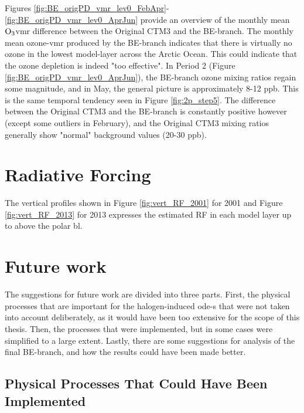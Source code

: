 Figures \ref{fig:BE_origPD_vmr_lev0_FebApr}-\ref{fig:BE_origPD_vmr_lev0_AprJun} provide an overview of the monthly mean $\mathrm{O_3}$\acrshort{vmr} difference between the Original CTM3 and the BE-branch. The monthly mean ozone-\acrshort{vmr} produced by the BE-branch indicates that there is virtually no ozone in the lowest model-layer across the Arctic Ocean. This could indicate that the ozone depletion is indeed "too effective". In Period 2 (Figure \ref{fig:BE_origPD_vmr_lev0_AprJun}), the BE-branch ozone mixing ratios regain some magnitude, and in May, the general picture is approximately 8-12 ppb. This is the same temporal tendency seen in Figure \ref{fig:2p_step5}. The difference between the Original CTM3 and the BE-branch is constantly positive however (except some outliers in February), and the Original CTM3 mixing ratios generally show "normal" background values (20-30 ppb). 

\section{Radiative Forcing}\label{sec:disc_RF}

The vertical profiles shown in Figure \ref{fig:vert_RF_2001} for 2001 and Figure \ref{fig:vert_RF_2013} for 2013 expresses the estimated RF in each model layer up to above the polar \acrlong{bl}. 



\section{Future work}

The suggestions for future work are divided into three parts. First, the physical processes that are important for the halogen-induced \acrlong{ode}-s that were not taken into account deliberately, as it would have been too extensive for the scope of this thesis. Then, the processes that were implemented, but in some cases were simplified to a large extent. Lastly, there are some suggestions for analysis of the final BE-branch, and how the results could have been made better.

\subsection{Physical Processes That Could Have Been Implemented}

